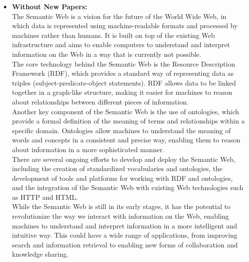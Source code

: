 \documentclass[fleqn,moreauthors,10pt]{ds_report}
\begin{document}
\begin{itemize}
  \item \textbf{Without New Papers:} \\
  The Semantic Web is a vision for the future of the World Wide Web, in which data is represented using machine-readable formats and processed by machines rather than humans. It is built on top of the existing Web infrastructure and aims to enable computers to understand and interpret information on the Web in a way that is currently not possible. \\[6pt]
  The core technology behind the Semantic Web is the Resource Description Framework (RDF), which provides a standard way of representing data as triples (subject-predicate-object statements). RDF allows data to be linked together in a graph-like structure, making it easier for machines to reason about relationships between different pieces of information. \\[6pt]
  Another key component of the Semantic Web is the use of ontologies, which provide a formal definition of the meaning of terms and relationships within a specific domain. Ontologies allow machines to understand the meaning of words and concepts in a consistent and precise way, enabling them to reason about information in a more sophisticated manner. \\[6pt]
  There are several ongoing efforts to develop and deploy the Semantic Web, including the creation of standardized vocabularies and ontologies, the development of tools and platforms for working with RDF and ontologies, and the integration of the Semantic Web with existing Web technologies such as HTTP and HTML. \\[6pt]
  While the Semantic Web is still in its early stages, it has the potential to revolutionize the way we interact with information on the Web, enabling machines to understand and interpret information in a more intelligent and intuitive way. This could have a wide range of applications, from improving search and information retrieval to enabling new forms of collaboration and knowledge sharing.


\end{itemize}
\end{document}
